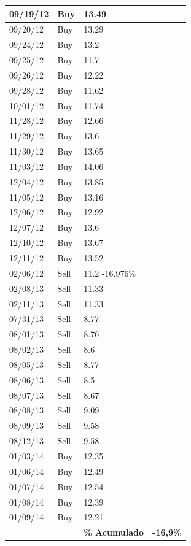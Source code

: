 \begin{apendicesenv}
\begin{center}
\begin{longtable}{| p{4cm} | p{4cm} |p{4cm} |p{2cm} |}
	09/19/12	&Buy	&13.49	&\\ \hline
	09/20/12	&Buy	&13.29	&\\ \hline
	09/24/12	&Buy	&13.2	&\\ \hline
	09/25/12	&Buy	&11.7	&\\ \hline
	09/26/12	&Buy	&12.22	&\\ \hline
	09/28/12	&Buy	&11.62	&\\ \hline
	10/01/12	&Buy	&11.74	&\\ \hline
	11/28/12	&Buy	&12.66	&\\ \hline
	11/29/12	&Buy	&13.6	&\\ \hline
	11/30/12	&Buy	&13.65	&\\ \hline
	11/03/12	&Buy	&14.06	&\\ \hline
	12/04/12	&Buy	&13.85	&\\ \hline
	11/05/12	&Buy	&13.16	&\\ \hline
	12/06/12	&Buy	&12.92	&\\ \hline
	12/07/12	&Buy	&13.6	&\\ \hline
	12/10/12	&Buy	&13.67	&\\ \hline
	12/11/12	&Buy	&13.52	&\\ \hline
	02/06/12	&Sell	&11.2	-16.976\%\\ \hline
	02/08/13	&Sell	&11.33	&\\ \hline
	02/11/13	&Sell	&11.33	&\\ \hline
	07/31/13	&Sell	&8.77	&\\ \hline
	08/01/13	&Sell	&8.76	&\\ \hline
	08/02/13	&Sell	&8.6	&\\ \hline
	08/05/13	&Sell	&8.77	&\\ \hline
	08/06/13	&Sell	&8.5	&\\ \hline
	08/07/13	&Sell	&8.67	&\\ \hline
	08/08/13	&Sell	&9.09	&\\ \hline
	08/09/13	&Sell	&9.58	&\\ \hline
	08/12/13	&Sell	&9.58	&\\ \hline
	01/03/14	&Buy	&12.35	&\\ \hline
	01/06/14	&Buy	&12.49	&\\ \hline
	01/07/14	&Buy	&12.54	&\\ \hline
	01/08/14	&Buy	&12.39	&\\ \hline
	01/09/14	&Buy	&12.21	&\\ \hline
		

	{} 		&{}		&\textbf{\% Acumulado} 	&\textbf{-16,9\%}


\end{longtable}
\end{center}
\end{apendicesenv}

